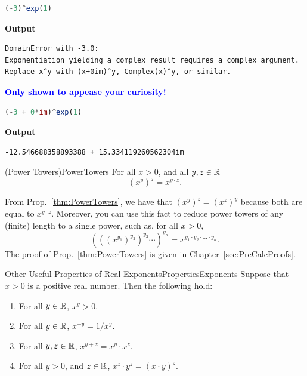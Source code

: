 \begin{lstlisting}[language=Julia,style=mystyle]
(-3)^exp(1)
\end{lstlisting}
\textbf{Output} 
\begin{verbatim}
DomainError with -3.0:
Exponentiation yielding a complex result requires a complex argument.
Replace x^y with (x+0im)^y, Complex(x)^y, or similar.
\end{verbatim}

\textcolor{blue}{\bf Only shown to appease your curiosity!}

\begin{lstlisting}[language=Julia,style=mystyle]
(-3 + 0*im)^exp(1)
\end{lstlisting}
\textbf{Output} 
\begin{verbatim}
-12.546688358893388 + 15.334119260562304im
\end{verbatim}

\Qed



\begin{propColor}{(Power Towers)}{PowerTowers}
 For all $x>0$, and all $y, z \in \mathbb R$
 \begin{equation}
        \left(x^y \right)^z = x^{y \cdot z}. 
    \end{equation}

\end{propColor}

From Prop.~\ref{thm:PowerTowers}, we have that $ \left(x^y \right)^z = \left(x^z \right)^y$ because both are equal to $x^{y \cdot z}$. Moreover, you can use this fact to reduce power towers of any (finite) length to a single power, such as, for all $x>0$,
\[
\left( \left( \left( x^{y_1} \right)^{y_2} \right)^{y_3} \cdots \right)^{y_n} = x^{y_1 \cdot y_2 \cdot \ldots \cdot y_n}.
\] The proof of Prop.~\ref{thm:PowerTowers} is given in Chapter~\ref{sec:PreCalcProofs}.


\begin{propColor}{Other Useful Properties of Real Exponents}{PropertiesExponents} 
Suppose that $x>0$ is a positive real number. Then the following hold:
\begin{enumerate}
\renewcommand{\labelenumi}{(\alph{enumi})}
\setlength{\itemsep}{.2cm}
    \item For all $y \in \mathbb R$, $x^y >0$. 
    \item For all $y \in \mathbb R$, $x^{-y} = 1/x^y$.
    \item For all $y, z \in \mathbb R$, $x^{y+z} = x^y \cdot x^z$.
    \item For all $y>0$, and $z \in \mathbb R$, $x^{z} \cdot y^z =  (x \cdot y)^z$.
\end{enumerate}
    
\end{propColor}

